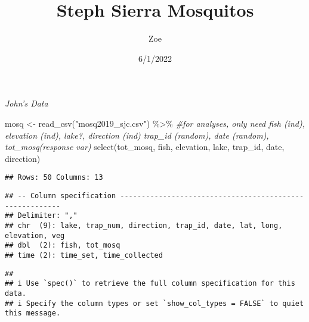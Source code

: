 \documentclass[
]{article}
\title{Steph Sierra Mosquitos}
\author{Zoe}
\date{6/1/2022}
\newenvironment{Shaded}{\begin{snugshade}}{\end{snugshade}}
\newcommand{\AttributeTok}[1]{\textcolor[rgb]{0.77,0.63,0.00}{#1}}
\newcommand{\CommentTok}[1]{\textcolor[rgb]{0.56,0.35,0.01}{\textit{#1}}}
\newcommand{\FunctionTok}[1]{\textcolor[rgb]{0.00,0.00,0.00}{#1}}
\newcommand{\NormalTok}[1]{#1}
\newcommand{\OtherTok}[1]{\textcolor[rgb]{0.56,0.35,0.01}{#1}}
\newcommand{\SpecialCharTok}[1]{\textcolor[rgb]{0.00,0.00,0.00}{#1}}
\newcommand{\StringTok}[1]{\textcolor[rgb]{0.31,0.60,0.02}{#1}}
\begin{document}
\maketitle

\emph{John's Data}

\begin{Shaded}
\begin{Highlighting}[]
\NormalTok{mosq }\OtherTok{\textless{}{-}} \FunctionTok{read\_csv}\NormalTok{(}\StringTok{"mosq2019\_sjc.csv"}\NormalTok{) }\SpecialCharTok{\%\textgreater{}\%} 
  \CommentTok{\#for analyses, only need fish (ind), elevation (ind), lake?, direction (ind) trap\_id (random), date (random), tot\_mosq(response var)}
  \FunctionTok{select}\NormalTok{(tot\_mosq, fish, elevation, lake, trap\_id, date, direction)}
\end{Highlighting}
\end{Shaded}

\begin{verbatim}
## Rows: 50 Columns: 13
\end{verbatim}

\begin{verbatim}
## -- Column specification --------------------------------------------------------
## Delimiter: ","
## chr  (9): lake, trap_num, direction, trap_id, date, lat, long, elevation, veg
## dbl  (2): fish, tot_mosq
## time (2): time_set, time_collected
\end{verbatim}

\begin{verbatim}
## 
## i Use `spec()` to retrieve the full column specification for this data.
## i Specify the column types or set `show_col_types = FALSE` to quiet this message.
\end{verbatim}

\begin{Shaded}
\end{Shaded}
\end{document}
